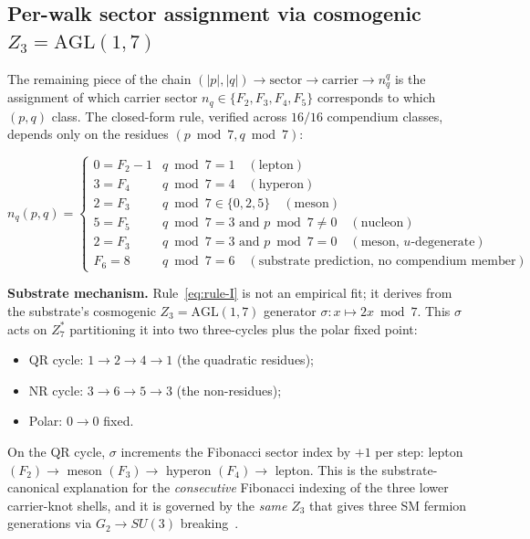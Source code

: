 \documentclass[11pt]{article}
\begin{document}
\subsection{Per-walk sector assignment via cosmogenic $Z_3 = \mathrm{AGL}(1, 7)$}
\label{sec:sector-z3}

The remaining piece of the chain $(|p|, |q|) \to \mathrm{sector} \to \mathrm{carrier} \to n_q^q$ is the assignment of which carrier sector $n_q \in \{F_2, F_3, F_4, F_5\}$ corresponds to which $(p, q)$ class.  The closed-form rule, verified across $16/16$ compendium classes, depends only on the residues $(p \bmod 7, q \bmod 7)$:

\begin{equation}
\label{eq:rule-I}
n_q(p, q) =
\begin{cases}
  0 = F_2 - 1 & q \bmod 7 = 1 \quad (\text{lepton}) \\
  3 = F_4     & q \bmod 7 = 4 \quad (\text{hyperon}) \\
  2 = F_3     & q \bmod 7 \in \{0, 2, 5\} \quad (\text{meson}) \\
  5 = F_5     & q \bmod 7 = 3 \text{ and } p \bmod 7 \neq 0 \quad (\text{nucleon}) \\
  2 = F_3     & q \bmod 7 = 3 \text{ and } p \bmod 7 = 0 \quad (\text{meson, $u$-degenerate}) \\
  F_6 = 8     & q \bmod 7 = 6 \quad (\text{substrate prediction, no compendium member})
\end{cases}
\end{equation}

\textbf{Substrate mechanism.}  Rule~\eqref{eq:rule-I} is not an empirical fit; it derives from the substrate's cosmogenic $Z_3 = \mathrm{AGL}(1, 7)$ generator $\sigma : x \mapsto 2x \bmod 7$.  This $\sigma$ acts on $Z_7^*$ partitioning it into two three-cycles plus the polar fixed point:
\begin{itemize}
\item QR cycle: $1 \to 2 \to 4 \to 1$ (the quadratic residues);
\item NR cycle: $3 \to 6 \to 5 \to 3$ (the non-residues);
\item Polar: $0 \to 0$ fixed.
\end{itemize}
On the QR cycle, $\sigma$ increments the Fibonacci sector index by $+1$ per step: lepton $(F_2) \to$ meson $(F_3) \to$ hyperon $(F_4) \to$ lepton.  This is the substrate-canonical explanation for the \emph{consecutive} Fibonacci indexing of the three lower carrier-knot shells, and it is governed by the \emph{same} $Z_3$ that gives three SM fermion generations via $G_2 \to SU(3)$ breaking~\cite{Paper20}.
\end{document}
